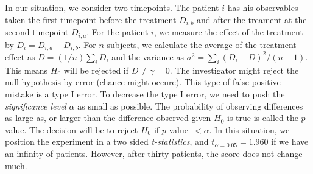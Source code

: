 \documentclass[final, paper=letter,5p,times,twocolumn]{elsarticle}
\theoremstyle{definition}
\begin{document}
In our situation, we consider two timepoints. The patient $i$ has his observables taken the first timepoint before the treatment $D_{i,b}$ and after the treament at the second timepoint $D_{i,a}$. For the patient $i$, we measure the effect of the treatment by $D_{i} = D_{i,a} - D_{i,b}$. For $n$ subjects, we calculate the average of the treatment effect as $D = (1/n)\sum_{i} D_{i}$ and the variance as $\sigma^{2} = \sum_{i} (D_{i} - D)^{2} / (n-1)$. This means $H_{0}$ will be rejected if $D \ne \gamma = 0$. The investigator might reject the null hypothesis by error (chance might occure). This type of false positive mistake is a type I error. To decrease the type I error, we need to push the {\it significance level} $\alpha$ as small as possible. The probability of observing differences as large as, or larger than the difference observed given $H_{0}$ is true is called the $p$-value. The decision will be to reject $H_{0}$ if $p$-value~$<\alpha$. In this situation, we position the experiment in a two sided {\it t-statistics}, and $t_{\alpha = 0.05} = 1.960$ if we have an infinity of patients. However, after thirty patients, the score does not change much.
\end{document}
